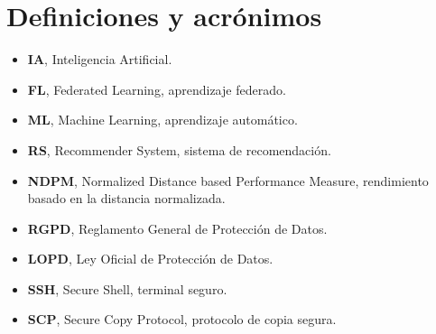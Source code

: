 \chapter*{Definiciones y acrónimos}
\thispagestyle{fancy}

\begin{itemize}
    \item \textbf{IA}, Inteligencia Artificial.
    \item \textbf{FL}, Federated Learning, aprendizaje federado.
    \item \textbf{ML}, Machine Learning, aprendizaje automático.
    \item \textbf{RS}, Recommender System, sistema de recomendación.
    \item \textbf{NDPM}, Normalized Distance based Performance Measure, rendimiento basado en la distancia normalizada.
    \item \textbf{RGPD}, Reglamento General de Protección de Datos.
    \item \textbf{LOPD}, Ley Oficial de Protección de Datos.
    \item \textbf{SSH}, Secure Shell, terminal seguro.
    \item \textbf{SCP}, Secure Copy Protocol, protocolo de copia segura.
\end{itemize}
